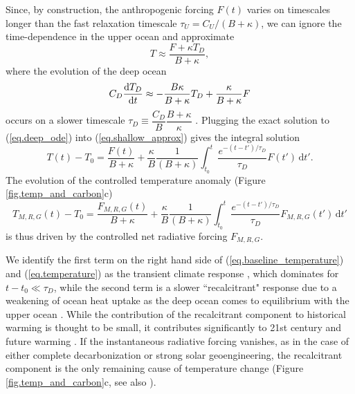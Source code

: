 \documentclass{article}
\begin{document}
Since, by construction, the anthropogenic forcing $F(t)$ varies on timescales longer than the fast relaxation timescale $\tau_{U} = C_{U}/(B + \kappa)$, we can ignore the time-dependence in the upper ocean and approximate
\begin{equation}
    T \approx \frac{F+\kappa T_{D}}{B + \kappa},
    \label{eq.shallow_approx}
\end{equation}
where the evolution of the deep ocean
\begin{equation}
    C_{D} \dv{T_{D}}{t} \approx - \frac{B \kappa}{B + \kappa} T_{D} + \frac{\kappa}{B + \kappa} F
    \label{eq.deep_ode}
\end{equation}
occurs on a slower timescale $\tau_{D} \equiv \dfrac{C_{D}}{B} \dfrac{B + \kappa}{\kappa}$ \citep{held_probing_2010}. Plugging the exact solution to (\ref{eq.deep_ode}) into (\ref{eq.shallow_approx}) gives the integral solution
\begin{equation}
    T(t) - T_{0} = \frac{F(t)}{B + \kappa} + \frac{\kappa}{B} \frac{1}{(B+\kappa)} \int_{t_{0}}^{t} \frac{ e^{-(t-t')/\tau_{D}}}{\tau_{D}} F(t') \, \text{d}t'.\label{eq.baseline_temperature}
\end{equation}
The evolution of the controlled temperature anomaly (Figure \ref{fig.temp_and_carbon}c)
\begin{equation}
    T_{M,R,G}(t) - T_{0} =  \frac{F_{M,R,G}(t)}{B + \kappa} + \frac{\kappa}{B} \frac{1}{(B+\kappa)} \int_{t_{0}}^{t} \frac{ e^{-(t-t')/\tau_{D}}}{\tau_{D}} F_{M,R,G}(t') \, \text{d}t'\label{eq.temperature}
\end{equation}
is thus driven by the controlled net radiative forcing $F_{M,R,G}$.

We identify the first term on the right hand side of (\ref{eq.baseline_temperature}) and (\ref{eq.temperature}) as the transient climate response \citep{gregory_transient_2008}, which dominates for $t-t_{0} \ll \tau_{D}$, while the second term is a slower ``recalcitrant" response due to a weakening of ocean heat uptake as the deep ocean comes to equilibrium with the upper ocean \citep{held_probing_2010}. While the contribution of the recalcitrant component to historical warming is thought to be small, it contributes significantly to 21st century and future warming \citep{gregory_transient_2008,held_probing_2010}. If the instantaneous radiative forcing vanishes, as in the case of either complete decarbonization or strong solar geoengineering, the recalcitrant component is the only remaining cause of temperature change (Figure \ref{fig.temp_and_carbon}c, see also \citealt{gregory_transient_2008, held_probing_2010}).
\end{document}
